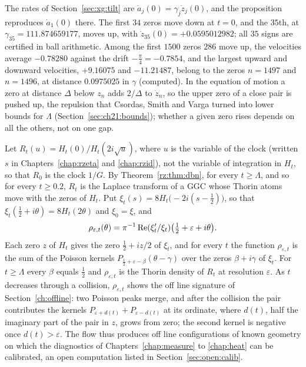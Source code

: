 The rates of Section~\ref{sec:xg:tilt} are $\dot a_j(0)=\gamma_j\dot z_j(0)$, and the proposition reproduces $\dot a_1(0)$ there. The first $34$ zeros move down at $t=0$, and the $35$th, at $\gamma_{35}=111.874659177$, moves up, with $\dot z_{35}(0)=+0.0595012982$; all $35$ signs are certified in ball arithmetic. Among the first $1500$ zeros $286$ move up, the velocities average $-0.78280$ against the drift $-\frac\pi4=-0.7854$, and the largest upward and downward velocities, $+9.16075$ and $-11.21487$, belong to the zeros $n=1497$ and $n=1496$, at distance $0.0975025$ in $\gamma$ (computed). In the equation of motion a zero at distance $\Delta$ below $z_n$ adds $2/\Delta$ to $\dot z_n$, so the upper zero of a close pair is pushed up, the repulsion that Csordas, Smith and Varga \cite{CSV94} turned into lower bounds for $\Lambda$ (Section~\ref{sec:ch21:bounds}); whether a given zero rises depends on all the others, not on one gap.

Let $R_t(u)=H_t(0)/H_t(2i\sqrt u)$, where $u$ is the variable of the clock (written $s$ in Chapters~\ref{chap:rzeta} and \ref{chap:rzid}), not the variable of integration in $H_t$, so that $R_0$ is the clock $1/G$. By Theorem~\ref{rz:thm:dbn}, for every $t\ge\Lambda$, and so for every $t\ge0.2$, $R_t$ is the Laplace transform of a GGC whose Thorin atoms move with the zeros of $H_t$. Put $\xi_t(s)=8H_t\big(-2i(s-\frac12)\big)$, so that $\xi_t(\frac12+i\theta)=8H_t(2\theta)$ and $\xi_0=\xi$, and
\[
\rho_{\varepsilon,t}(\theta)=\pi^{-1}\operatorname{Re}(\xi_t'/\xi_t)\big(\tfrac12+\varepsilon+i\theta\big).
\]
Each zero $z$ of $H_t$ gives the zero $\frac12+iz/2$ of $\xi_t$, and for every $t$ the function $\rho_{\varepsilon,t}$ is the sum of the Poisson kernels $P_{\frac12+\varepsilon-\beta}(\theta-\gamma)$ over the zeros $\beta+i\gamma$ of $\xi_t$. For $t\ge\Lambda$ every $\beta$ equals $\frac12$ and $\rho_{\varepsilon,t}$ is the Thorin density of $R_t$ at resolution $\varepsilon$. As $t$ decreases through a collision, $\rho_{\varepsilon,t}$ shows the off line signature of Section~\ref{ch:offline}: two Poisson peaks merge, and after the collision the pair contributes the kernels $P_{\varepsilon+d(t)}+P_{\varepsilon-d(t)}$ at its ordinate, where $d(t)$, half the imaginary part of the pair in $z$, grows from zero; the second kernel is negative once $d(t)>\varepsilon$. The flow thus produces off line configurations of known geometry on which the diagnostics of Chapters~\ref{chap:measure} to \ref{chap:heat} can be calibrated, an open computation listed in Section~\ref{sec:open:calib}.

